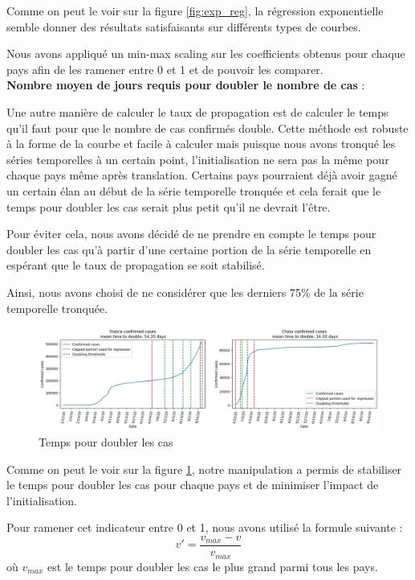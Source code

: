 \documentclass[12pt]{iEEEtran}
\begin{document}
Comme on peut le voir sur la figure \ref{fig:exp_reg}, la régression exponentielle semble donner
des résultats satisfaisants sur différents types de courbes.

Nous avons appliqué un min-max scaling sur les coefficients obtenus pour chaque pays afin de les
ramener entre 0 et 1 et de pouvoir les comparer.
\\

\noindent\textbf{Nombre moyen de jours requis pour doubler le nombre de cas} :

Une autre manière de calculer le taux de propagation est de calculer le temps qu'il faut pour que le nombre
de cas confirmés double. Cette méthode est robuste à la forme de la courbe et facile à calculer mais puisque
nous avons tronqué les séries temporelles à un certain point, l'initialisation ne sera pas la même pour chaque
pays même après translation. Certains pays pourraient déjà avoir gagné un certain élan au début de la série
temporelle tronquée et cela ferait que le temps pour doubler les cas serait plus petit qu'il ne devrait l'être.

Pour éviter cela, nous avons décidé de ne prendre en compte le temps pour doubler les cas qu'à partir
d'une certaine portion de la série temporelle en espérant que le taux de propagation se soit stabilisé.

Ainsi, nous avons choisi de ne considérer que les derniers 75\% de la série temporelle tronquée.

\begin{figure}[h]
    \centering
    \includegraphics[width=\columnwidth]{img/time_double.png}
    \caption{Temps pour doubler les cas}

    \label{fig:time_double}
\end{figure}

Comme on peut le voir sur la figure \ref{fig:time_double}, notre manipulation a permis de stabiliser
le temps pour doubler les cas pour chaque pays et de minimiser l'impact de l'initialisation.

Pour ramener cet indicateur entre 0 et 1, nous avons utilisé la formule suivante :
$$v' = \frac{v_{max}-v}{v_{max}}$$ où $v_{max}$ est le temps pour doubler les cas le plus grand parmi
tous les pays.
\\
\end{document}
